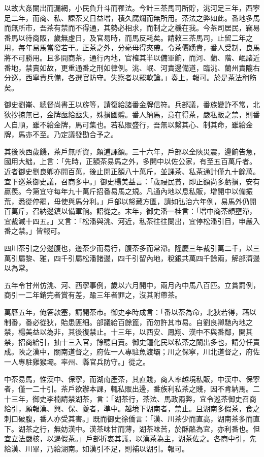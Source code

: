 以故大姦闌出而漏網，小民負升斗而罹法。今計三茶馬司所貯，洮河足三年，西寧足二年，而商、私、課茶又日益增，積久腐爛而無所用。茶法之弊如此。番地多馬而無所市，吾茶有禁而不得通，其勢必相求，而制之之機在我。今茶司居民，竊易番馬以待商販，歲無虛日，及官易時，而馬反耗矣。請敕三茶馬司，止留二年之用，每年易馬當發若干。正茶之外，分毫毋得夾帶。令茶價踴貴，番人受制，良馬將不可勝用。且多開商茶，通行內地，官榷其半以備軍餉，而河、蘭、階、岷諸近番地，禁賣如故，更重通番之刑如律例。洮、岷、河責邊備道，臨洮、蘭州責隴右分巡，西寧責兵備，各選官防守。失察者以罷軟論。」奏上，報可。於是茶法稍飭矣。

御史劉崙、總督尚書王以旂等，請復給諸番金牌信符。兵部議，番族變詐不常，北狄抄掠無已，金牌亟給亟失，殊損國體。番人納馬，意在得茶，嚴私販之禁，則番人自順，雖不給金牌，馬可集也。若私販盛行，吾無以繫其心、制其命，雖給金牌，馬亦不至。乃定議發勘合予之。

其後陜西歲饑，茶戶無所資，頗逋課額。三十六年，戶部以全陜災震，邊餉告急，國用大絀，上言：「先時，正額茶易馬之外，多開中以佐公家，有至五百萬斤者。近者御史劉良卿亦開百萬，後止開正額八十萬斤，並課茶、私茶通計僅九十餘萬。宜下巡茶御史議，召商多中。」御史楊美益言：「歲祲民貧，即正額尚多虧損，安有贏羨。今第宜守每年九十萬斤招番易馬之規。凡通內地以息私販，增開中以備振荒，悉從停罷，毋使與馬分利。」戶部以帑藏方匱，請如弘治六年例，易馬外仍開百萬斤，召納邊鎮以備軍餉。詔從之。末年，御史潘一桂言：「增中商茶頗壅滯，宜裁減十四五。」又言：「松潘與洮、河近，私茶往往闌出，宜停松潘引目，申嚴入番之禁。」皆報可。

四川茶引之分邊腹也，邊茶少而易行，腹茶多而常滯。隆慶三年裁引萬二千，以三萬引屬黎、雅，四千引屬松潘諸邊，四千引留內地，稅銀共萬四千餘兩，解部濟邊以為常。

五年令甘州仿洮、河、西寧事例，歲以六月開中，兩月內中馬八百匹。立賞罰例，商引一二年銷完者賞有差，踰三年者罪之，沒其附帶茶。

萬曆五年，俺答款塞，請開茶市。御史李時成言：「番以茶為命，北狄若得，藉以制番，番必從狄，貽患匪細。部議給百餘篦，而勿許其市易。自劉良卿馳內地之禁，楊美益以為非，其後復禁止。十三年，以西安、鳳翔、漢中不與番鄰，開其禁，招商給引，抽十三入官，餘聽自賣。御史鐘化民以私茶之闌出多也，請分任責成。陜之漢中，關南道督之，府佐一人專駐魚渡壩；川之保寧，川北道督之，府佐一人專駐雞猴壩。率州、縣官兵防守。」從之。

中茶易馬，惟漢中、保寧，而湖南產茶，其直賤，商人率越境私販，中漢中、保寧者，僅一二十引。茶戶欲辦本課，輒私販出邊，番族利私茶之賤，因不肯納馬。二十三年，御史李楠請禁湖茶，言：「湖茶行，茶法、馬政兩弊，宜令巡茶御史召商給引，願報漢、興、保、夔者，準中。越境下湖南者，禁止。且湖南多假茶，食之刺口破腹，番人亦受其害。」既而御史徐僑言：「漢、川茶少而直高，湖南茶多而直下。湖茶之行，無妨漢中。漢茶味甘而薄，湖茶味苦，於酥酪為宜，亦利番也。但宜立法嚴核，以遏假茶。」戶部折衷其議，以漢茶為主，湖茶佐之。各商中引，先給漢、川畢，乃給湖南。如漢引不足，則補以湖引。報可。


